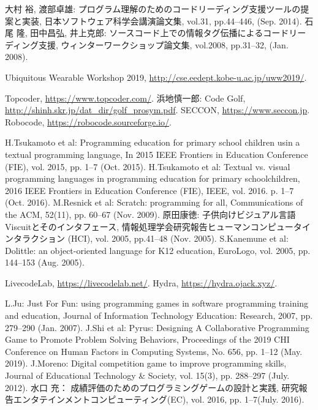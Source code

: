 \begin{thebibliography}{99}
	大村 裕, 渡部卓雄: プログラム理解のためのコードリーディング支援ツールの提案と実装, 日本ソフトウェア科学会講演論文集, vol.31, pp.44--446, (Sep. 2014).
	石尾 隆, 田中昌弘, 井上克郎: ソースコード上での情報タグ伝播によるコードリーディング支援, ウィンターワークショップ論文集, vol.2008, pp.31--32, (Jan. 2008).

	Ubiquitous Wearable Workshop 2019, \url{http://cse.eedept.kobe-u.ac.jp/uww2019/}.


	Topcoder, \url{https://www.topcoder.com/}.
	浜地慎一郎: Code Golf, \url{http://shinh.skr.jp/dat_dir/golf_prosym.pdf}.
	SECCON, \url{https://www.seccon.jp}.
	Robocode, \url{https://robocode.sourceforge.io/}.

	H.Tsukamoto et al: Programming education for primary school children usin a textual programming language, In 2015 IEEE Frontiers in Education Conference (FIE), vol. 2015, pp. 1--7 (Oct. 2015).
	H.Tsukamoto et al: Textual vs. visual programming languages in programming education for primary schoolchildren, 2016 IEEE Frontiers in Education Conference (FIE), IEEE, vol. 2016. p. 1--7 (Oct. 2016).
	M.Resnick et al: Scratch: programming for all, Communications of the ACM, 52(11), pp. 60--67 (Nov. 2009).
	原田康徳: 子供向けビジュアル言語 Viscuitとそのインタフェース, 情報処理学会研究報告ヒューマンコンピュータインタラクション (HCI), vol. 2005, pp.41--48 (Nov. 2005).
	S.Kanemune et al: Dolittle: an object-oriented language for K12 education, EuroLogo, vol. 2005, pp. 144--153 (Aug. 2005).

	LivecodeLab, \url{https://livecodelab.net/}.
	Hydra, \url{https://hydra.ojack.xyz/}.

	L.Ju: Just For Fun: using programming games in software programming training and education, Journal of Information Technology Education: Research, 2007, pp. 279--290 (Jan. 2007).
	J.Shi et al: Pyrus: Designing A Collaborative Programming Game to Promote Problem Solving Behaviors, Proceedings of the 2019 CHI Conference on Human Factors in Computing Systems, No. 656, pp. 1--12 (May. 2019).
	J.Moreno: Digital competition game to improve programming skills, Journal of Educational Technology \& Society, vol. 15(3), pp. 288--297 (July. 2012).
	水口 充： 成績評価のためのプログラミングゲームの設計と実践, 研究報告エンタテインメントコンピューティング(EC), vol. 2016, pp. 1–7(July. 2016).


\end{thebibliography}
